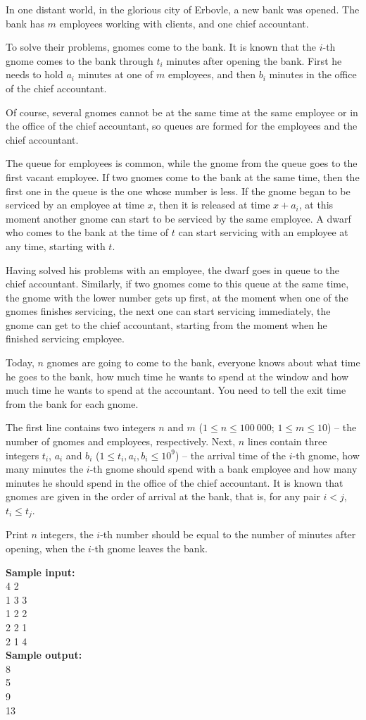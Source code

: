 \documentclass[a4paper]{article}
\begin{document}
In one distant world, in the glorious city of Erbovle, a new bank was opened. The bank has $m$ employees working with clients, and one chief accountant.

To solve their problems, gnomes come to the bank. It is known that the $i$-th gnome comes to the bank through $t_i$ minutes after opening the bank. First he needs to hold $a_i$ minutes at one of $m$ employees, and then $b_i$ minutes in the office of the chief accountant.

Of course, several gnomes cannot be at the same time at the same employee or in the office of the chief accountant, so queues are formed for the employees and the chief accountant.

The queue for employees is common, while the gnome from the queue goes to the first vacant employee. If two gnomes come to the bank at the same time, then the first one in the queue is the one whose number is less. If the gnome began to be serviced by an employee at time $x$, then it is released at time $x + a_i$, at this moment another gnome can start to be serviced by the same employee. A dwarf who comes to the bank at the time of $t$ can start servicing with an employee at any time, starting with $t$.

Having solved his problems with an employee, the dwarf goes in queue to the chief accountant. Similarly, if two gnomes come to this queue at the same time, the gnome with the lower number gets up first, at the moment when one of the gnomes finishes servicing, the next one can start servicing immediately, the gnome can get to the chief accountant, starting from the moment when he finished servicing employee.

Today, $n$ gnomes are going to come to the bank, everyone knows about what time he goes to the bank, how much time he wants to spend at the window and how much time he wants to spend at the accountant. You need to tell the exit time from the bank for each gnome.

The first line contains two integers $n$ and $m$ ($1 \le n \le 100 \ 000$; $1 \le m \le 10$) -- the number of gnomes and employees, respectively. Next, $n$ lines contain three integers $t_i$, $a_i$ and $b_i$ ($1 \le t_i, a_i, b_i \le 10^9$) -- the arrival time of the $i$-th gnome, how many minutes the $i$-th gnome should spend with a bank employee and how many minutes he should spend in the office of the chief accountant. It is known that gnomes are given in the order of arrival at the bank, that is, for any pair $i < j$, $t_i \le t_j$.

Print $n$ integers, the $i$-th number should be equal to the number of minutes after opening, when the $i$-th gnome leaves the bank.

\LINE

\noindent \textbf{Sample input:}\\
4 2\\
1 3 3\\
1 2 2\\
2 2 1\\
2 1 4\\

\noindent \textbf{Sample output:}\\
8\\
5\\
9\\
13\\
\end{document}
